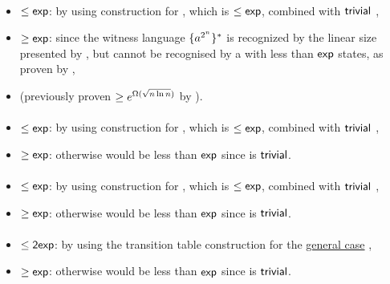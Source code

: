 \paragraph{\ODLA{}\tto\TNFA}\label{cost:1DLAto2NFAu}
\begin{itemize}
	\item $\le\mathsf{exp}$: by using construction for \hyperref[cost:1DLAto1DFAu]{\ODLA{}\tto\ODFA}, which is $\le\mathsf{exp}$, combined with $\mathsf{trivial}$ \ODFA{}\tto\TNFA,
	\item $\ge\mathsf{exp}$: since the witness language $\{a^{2^n}\}^*$ is recognized by the linear size \ODLA presented by , but cannot be recognised by a \TNFA with less than $\mathsf{exp}$ states, as proven by ,
	\item (previously proven $\ge e^{\Omega(\sqrt{n\ln n})}$ by ).
\end{itemize}
\paragraph{\ODLA{}\tto\ONFA}\label{cost:1LAto1NFAu}
\begin{itemize}
	\item $\le\mathsf{exp}$: by using construction for \hyperref[cost:1DLAto1DFAu]{\ODLA{}\tto\ODFA}, which is $\le\mathsf{exp}$, combined with $\mathsf{trivial}$ \ODFA{}\tto\ONFA,
	\item $\ge\mathsf{exp}$: otherwise \hyperref[cost:1DLAto2NFAu]{\ODLA{}\tto\TNFA} would be less than $\mathsf{exp}$ since \ONFA{}\tto\TNFA is $\mathsf{trivial}$.
\end{itemize}
\paragraph{\ODLA{}\tto\TDFA}\label{cost:1DLAto2DFAu}
\begin{itemize}
	\item $\le\mathsf{exp}$: by using construction for \hyperref[cost:1DLAto1DFAu]{\ODLA{}\tto\ODFA}, which is $\le\mathsf{exp}$, combined with $\mathsf{trivial}$ \ODFA{}\tto\TDFA,
	\item $\ge\mathsf{exp}$: otherwise \hyperref[cost:1DLAto2NFAu]{\ODLA{}\tto\TNFA} would be less than $\mathsf{exp}$ since \TDFA{}\tto\TNFA is $\mathsf{trivial}$.
\end{itemize}
\paragraph{\OLA{}\tto\ODFA}
\begin{itemize}
	\item $\le\mathsf{2exp}$: by using the transition table construction for the \hyperref[cost:1LAto1DFA]{general case} \cite{PigPis14},
	\item $\ge\mathsf{exp}$: otherwise \hyperref[cost:1DLAto1DFAu]{\ODLA{}\tto\ODFA} would be less than $\mathsf{exp}$ since \ODLA{}\tto\OLA is $\mathsf{trivial}$.
\end{itemize}
